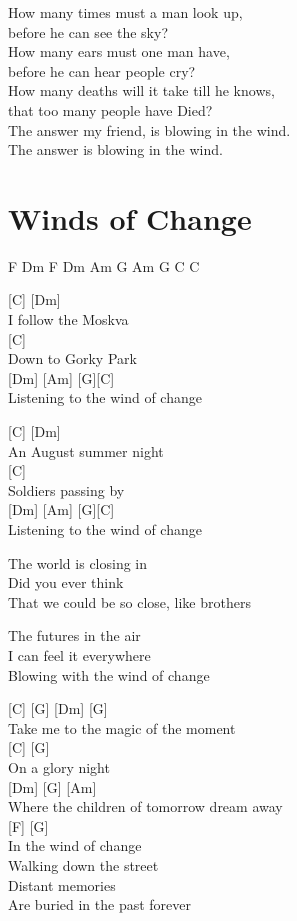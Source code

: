 \documentclass[
  letterpaper,
]{scrbook}
\begin{document}
How many times must a man look up,\\
before he can see the sky?\\
How many ears must one man have,\\
before he can hear people cry?\\
How many deaths will it take \textquotesingle till he knows,\\
that too many people have Died?\\
The answer my friend, is blowing in the wind.\\
The answer is blowing in the wind.

\hypertarget{winds-of-change}{%
\chapter{Winds of Change}\label{winds-of-change}}

F Dm F Dm Am G Am G C C

{[}C{]} {[}Dm{]}\\
I follow the Moskva\\
{[}C{]}\\
Down to Gorky Park\\
{[}Dm{]} {[}Am{]} {[}G{]}{[}C{]}\\
Listening to the wind of change

{[}C{]} {[}Dm{]}\\
An August summer night\\
{[}C{]}\\
Soldiers passing by\\
{[}Dm{]} {[}Am{]} {[}G{]}{[}C{]}\\
Listening to the wind of change

The world is closing in\\
Did you ever think\\
That we could be so close, like brothers

The future\textquotesingle s in the air\\
I can feel it everywhere\\
Blowing with the wind of change

{[}C{]} {[}G{]} {[}Dm{]} {[}G{]}\\
Take me to the magic of the moment\\
{[}C{]} {[}G{]}\\
On a glory night\\
{[}Dm{]} {[}G{]} {[}Am{]}\\
Where the children of tomorrow dream away\\
{[}F{]} {[}G{]}\\
In the wind of change\\
Walking down the street\\
Distant memories\\
Are buried in the past forever
\end{document}
